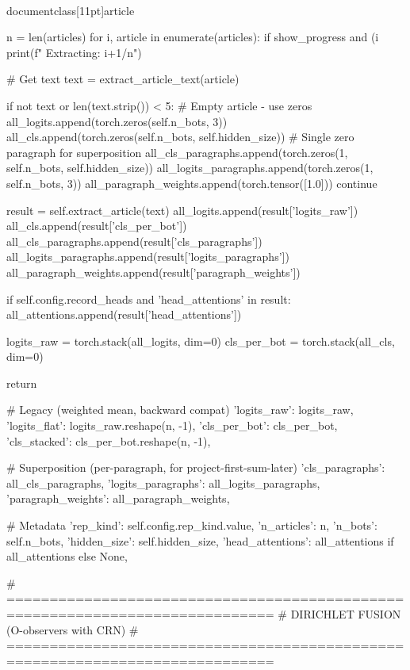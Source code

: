 \\documentclass[11pt]{article}
\begin{document}
\begin{CodeBlock}
        n = len(articles)
        for i, article in enumerate(articles):
            if show_progress and (i %
                print(f"  Extracting: {i+1}/{n}")

            # Get text
            text = extract_article_text(article)

            if not text or len(text.strip()) < 5:
                # Empty article - use zeros
                all_logits.append(torch.zeros(self.n_bots, 3))
                all_cls.append(torch.zeros(self.n_bots, self.hidden_size))
                # Single zero paragraph for superposition
                all_cls_paragraphs.append(torch.zeros(1, self.n_bots, self.hidden_size))
                all_logits_paragraphs.append(torch.zeros(1, self.n_bots, 3))
                all_paragraph_weights.append(torch.tensor([1.0]))
                continue

            result = self.extract_article(text)
            all_logits.append(result['logits_raw'])
            all_cls.append(result['cls_per_bot'])
            all_cls_paragraphs.append(result['cls_paragraphs'])
            all_logits_paragraphs.append(result['logits_paragraphs'])
            all_paragraph_weights.append(result['paragraph_weights'])

            if self.config.record_heads and 'head_attentions' in result:
                all_attentions.append(result['head_attentions'])

        logits_raw = torch.stack(all_logits, dim=0)
        cls_per_bot = torch.stack(all_cls, dim=0)

        return {
            # Legacy (weighted mean, backward compat)
            'logits_raw': logits_raw,
            'logits_flat': logits_raw.reshape(n, -1),
            'cls_per_bot': cls_per_bot,
            'cls_stacked': cls_per_bot.reshape(n, -1),

            # Superposition (per-paragraph, for project-first-sum-later)
            'cls_paragraphs': all_cls_paragraphs,
            'logits_paragraphs': all_logits_paragraphs,
            'paragraph_weights': all_paragraph_weights,

            # Metadata
            'rep_kind': self.config.rep_kind.value,
            'n_articles': n,
            'n_bots': self.n_bots,
            'hidden_size': self.hidden_size,
            'head_attentions': all_attentions if all_attentions else None,
        }


# =============================================================================
# DIRICHLET FUSION (O-observers with CRN)
# =============================================================================


\end{CodeBlock}
\end{document}
